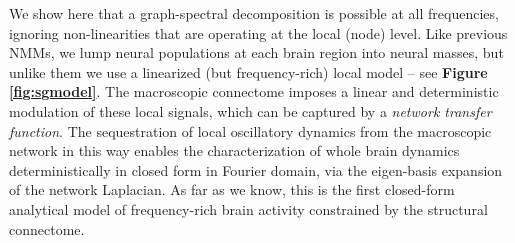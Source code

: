We show here that a graph-spectral decomposition is possible at all
frequencies, ignoring non-linearities that are operating at the local
(node) level. Like previous NMMs, we lump neural populations at each
brain region into neural masses, but unlike them we use a linearized
(but frequency-rich) local model -- see \textbf{Figure \ref{fig:sgmodel}}. The
macroscopic connectome imposes a linear and deterministic modulation of
these local signals, which can be captured by a \emph{network transfer
function}. The sequestration of local oscillatory dynamics from the
macroscopic network in this way enables the characterization of whole
brain dynamics deterministically in closed form in Fourier domain, via
the eigen-basis expansion of the network Laplacian. As far as we know,
this is the first closed-form analytical model of frequency-rich brain
activity constrained by the structural connectome.

